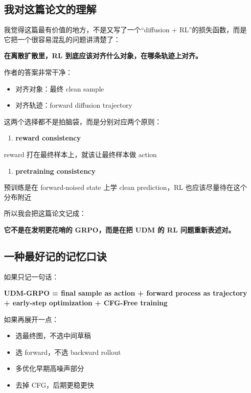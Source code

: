 \subsection{我对这篇论文的理解}

我觉得这篇最有价值的地方，不是又写了一个“diffusion + RL”的损失函数，而是它把一个很容易混乱的问题讲清楚了：

\textbf{在离散扩散里，RL 到底应该对齐什么对象，在哪条轨迹上对齐。}

作者的答案非常干净：

\begin{itemize}[leftmargin=1.5em]
  \item 对齐对象：最终 clean sample
  \item 对齐轨迹：forward diffusion trajectory
\end{itemize}

这两个选择都不是拍脑袋，而是分别对应两个原则：

\begin{enumerate}[leftmargin=1.5em]
  \item \textbf{reward consistency}
\end{enumerate}

reward 打在最终样本上，就该让最终样本做 action

\begin{enumerate}[leftmargin=1.5em]
  \item \textbf{pretraining consistency}
\end{enumerate}

预训练是在 forward-noised state 上学 clean prediction，RL 也应该尽量待在这个分布附近

所以我会把这篇论文记成：

\textbf{它不是在发明更花哨的 GRPO，而是在把 UDM 的 RL 问题重新表述对。}

\subsection{一种最好记的记忆口诀}

如果只记一句话：

\textbf{UDM-GRPO = final sample as action + forward process as trajectory + early-step optimization + CFG-Free training}

如果再展开一点：

\begin{itemize}[leftmargin=1.5em]
  \item {} 选最终图，不选中间草稿
  \item {} 选 forward，不选 backward rollout
  \item {} 多优化早期高噪声部分
  \item {} 去掉 CFG，后期更稳更快
\end{itemize}

